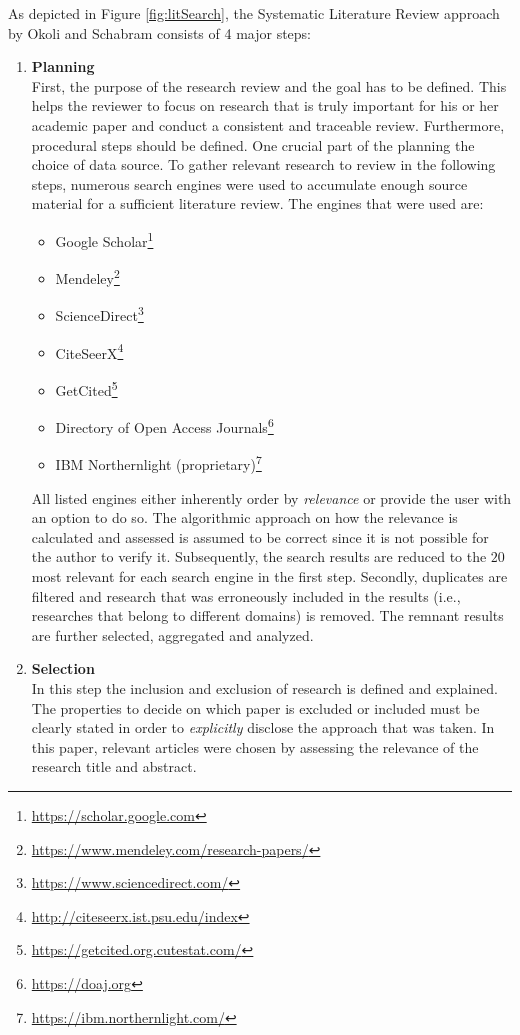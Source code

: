 As depicted in Figure \ref{fig:litSearch}, the Systematic Literature Review approach by Okoli and Schabram consists of 4 major steps: \\
\begin{enumerate}
    \item
    \textbf{Planning}\\
    First, the purpose of the research review and the goal has to be defined. This helps the reviewer to focus on research that is truly important for his or her academic paper and conduct a consistent and traceable review. Furthermore, procedural steps should be defined. One crucial part of the planning the choice of data source. To gather relevant research to review in the following steps, numerous search engines were used to accumulate enough source material for a sufficient literature review. The engines that were used are: 
    \begin{itemize}
        \renewcommand\labelitemi{--}
        \item Google Scholar\footnote{\url{https://scholar.google.com}}
        \item Mendeley\footnote{\url{https://www.mendeley.com/research-papers/}}
        \item ScienceDirect\footnote{\url{https://www.sciencedirect.com/}}
        \item CiteSeerX\footnote{\url{http://citeseerx.ist.psu.edu/index}}
        \item GetCited\footnote{\url{https://getcited.org.cutestat.com/}}
        \item Directory of Open Access Journals\footnote{\url{https://doaj.org}}
        \item IBM Northernlight (proprietary)\footnote{\url{https://ibm.northernlight.com/}}
    \end{itemize}
    All listed engines either inherently order by \textit{relevance} or provide the user with an option to do so. The algorithmic approach on how the relevance is calculated and assessed is assumed to be correct since it is not possible for the author to verify it. Subsequently, the search results are reduced to the $20$ most relevant for each search engine in the first step. Secondly, duplicates are filtered and research that was erroneously included in the results (i.e., researches that belong to different domains) is removed. The remnant results are further selected, aggregated and analyzed.
    \item
    \textbf{Selection}\\
    In this step the inclusion and exclusion of research is defined and explained. The properties to decide on which paper is excluded or included must be clearly stated in order to \textit{explicitly} disclose the approach that was taken. In this paper, relevant articles were chosen by assessing the relevance of the research title and abstract. 

\end{enumerate}
